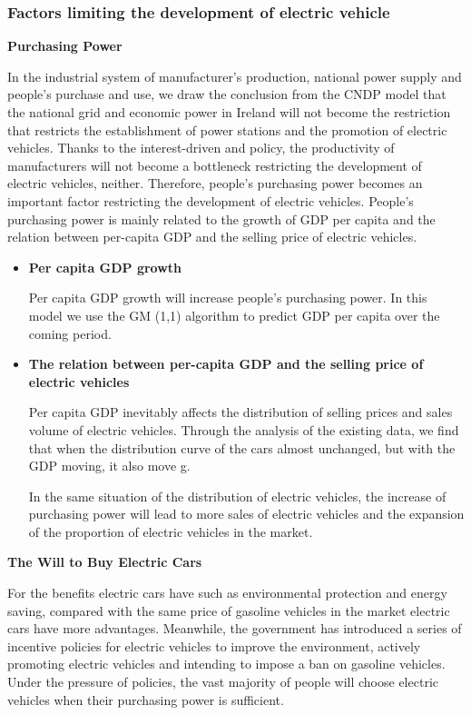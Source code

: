 \documentclass{mcmthesis}
\begin{document}
\subsubsection{Factors limiting the development of electric vehicle}


\textbf{Purchasing Power}

\par In the industrial system of manufacturer's production, national power supply and people's purchase and use, we draw the conclusion from the CNDP model that the national grid and economic power in Ireland will not become the restriction that restricts the establishment of power stations and the promotion of electric vehicles. Thanks to the interest-driven and policy, the productivity of manufacturers will not become a bottleneck restricting the development of electric vehicles, neither. Therefore, people's purchasing power becomes an important factor restricting the development of electric vehicles. People's purchasing power is mainly related to the growth of GDP per capita and the relation between per-capita GDP and the selling price of electric vehicles.            

\begin{itemize}
	\item \textbf{Per capita GDP growth}
		\par Per capita GDP growth will increase people's purchasing power. In this model we use the GM (1,1) algorithm to predict GDP per capita over the coming period.
	\item \textbf{The relation between per-capita GDP and the selling price of electric vehicles}
		\par Per capita GDP inevitably affects the distribution of selling prices and sales volume of electric vehicles. Through the analysis of the existing data, we find that when the distribution curve of the cars almost unchanged, but with the GDP moving, it also move g. 
		\par In the same situation of the distribution of electric vehicles, the increase of purchasing power will lead to more sales of electric vehicles and the expansion of the proportion of electric vehicles in the market.
\end{itemize}


\textbf{The Will to Buy Electric Cars}

\par For the benefits electric cars have such as environmental protection and energy saving, compared with the same price of gasoline vehicles in the market electric cars have more advantages. Meanwhile, the government has introduced a series of incentive policies for electric vehicles to improve the environment, actively promoting electric vehicles and intending to impose a ban on gasoline vehicles. Under the pressure of policies, the vast majority of people will choose electric vehicles when their purchasing power is sufficient.
\end{document}
